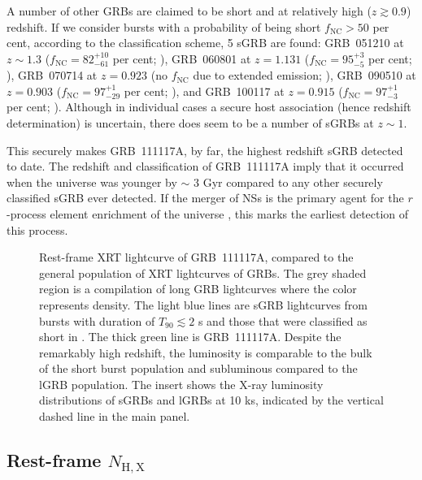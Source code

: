 \documentclass[referee]{aa}
\begin{document}
A number of other GRBs are claimed to be short and at relatively high ($z \gtrsim 0.9$) redshift.
If we consider bursts with a probability of being short $f_{\mathrm{NC}} > 50$ per cent, according to the
\citet{Bromberg2013} classification scheme, 5 sGRB are found:
GRB~051210 at $z \sim 1.3$ ($f_{\mathrm{NC}} = 82_{-61}^{+10}$ per cent;
\citealt{Leibler2010}),
GRB~060801 at $z = 1.131$ ($f_{\mathrm{NC}} = 95_{-5}^{+3}$ per cent;
\citealt{Berger2007}),
GRB~070714 at $z = 0.923$ (no $f_{\mathrm{NC}}$ due to extended emission;
\citealt{Graham2009}),
GRB~090510 at $z = 0.903$ ($f_{\mathrm{NC}} = 97_{-29}^{+1}$ per cent;
\citealt{McBreen2010}), and
GRB~100117 at $z = 0.915$ ($f_{\mathrm{NC}} = 97_{-3}^{+1}$ per cent;
\citealt{Fong2011}). Although in individual cases a secure host association
(hence redshift determination) is uncertain, there does seem to be a number of sGRBs at $z
\sim 1$.

This securely makes GRB~111117A, by far, the highest redshift sGRB detected to
date. The redshift and classification of GRB~111117A imply that it occurred when
the universe was younger by $\sim$ 3 Gyr compared to any other securely
classified sGRB ever detected. If the merger of NSs is the primary agent for the
$r$-process element enrichment of the universe \citep{Goriely2011, Ji2016,
	Komiya2016, Safarzadeh2017}, this marks the earliest detection of this process.

\begin{figure}
	\centering
	\caption{Rest-frame XRT lightcurve of GRB~111117A, compared to the general population of XRT lightcurves of GRBs. The grey shaded region is a compilation of long GRB lightcurves \citep{Evans2007, Evans2009} where the color represents density. The light blue lines are sGRB lightcurves from bursts with duration of $T_{90} \lesssim 2$ s and those that were classified as short in \citet{Kann2011, Berger2014, DAvanzo2014a}. The thick green line is GRB~111117A. Despite the remarkably high redshift, the luminosity is comparable to the bulk of the short burst population and subluminous compared to the lGRB population. The insert shows the X-ray luminosity distributions of sGRBs and lGRBs at 10 ks, indicated by the vertical dashed line in the main panel.}
	\label{fig:sxray_lightcurve}
\end{figure}

\subsection{Rest-frame $N_\mathrm{H,X}$ } \label{restnH}
\end{document}
